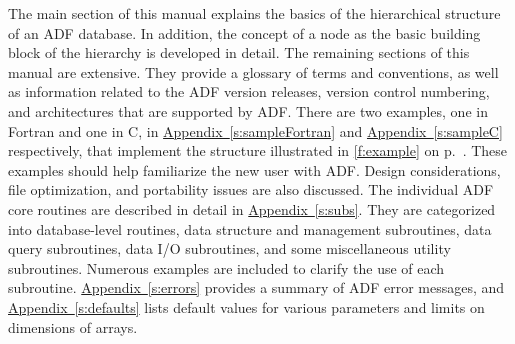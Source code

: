 The main section of this manual explains the basics of the
hierarchical structure of an ADF database.
In addition, the concept of a node as
the basic building block of the hierarchy is developed in detail.
The remaining sections of this manual are extensive.
They provide a glossary of terms and
conventions, as well as information related to the
ADF version releases,
version control numbering, and
architectures that are supported by ADF.
There are two examples, one in Fortran and one in C, in
\hyperref[s:sampleFortran]{Appendix~\ref*{s:sampleFortran}} and
\hyperref[s:sampleC]{Appendix~\ref*{s:sampleC}} respectively, that
implement the structure illustrated in \autoref{f:example} on
p.~\pageref*{f:example}.
These examples should help familiarize the new user with ADF.
Design considerations, file optimization, and portability issues are
also discussed.
The individual ADF core routines are described in detail in
\hyperref[s:subs]{Appendix~\ref*{s:subs}}.
They are categorized into
database-level routines,
data structure and management subroutines,
data query subroutines,
data I/O subroutines, and some
miscellaneous utility subroutines.
Numerous examples are included to clarify the use of each subroutine.
\hyperref[s:errors]{Appendix~\ref*{s:errors}} provides a summary of ADF
error messages, and \hyperref[s:defaults]{Appendix~\ref*{s:defaults}}
lists default values for various parameters and limits on dimensions of
arrays.
